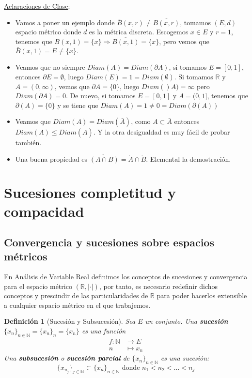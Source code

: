 \documentclass[10pt,a4paper,openright]{book}
\theoremstyle{break}
\newtheorem*{defi}{Definición}
\begin{document}
\underline{Aclaraciones de Clase}:
\begin{itemize}
\item Vamos a poner un ejemplo donde $\bar{B}(x,r)\neq \overline{B(x,r)}$, tomamos $(E,d)$ espacio métrico donde $d$ es la métrica discreta. Escogemos $x\in E$ y $r=1$, tenemos que $B(x,1)=\{x\}\Rightarrow \overline{B(x,1)} = \{x\}$, pero vemos que $\bar{B}(x,1) = E \neq \{x\}$.

\item Veamos que no siempre $Diam(A) = Diam (\partial A)$, si tomamos $E=[0,1]$, entonces $\partial E = \emptyset$, luego $Diam (E) =1 = Diam(\emptyset)$. Si tomamos $\mathbb{R}$ y $A=(0,\infty)$, vemos que $\partial A =\{0\}$, luego $Diam()A) = \infty$ pero $Diam (\partial A) = 0$. De nuevo, si tomamos $E=[0,1]$ y $A=(0,1]$, tenemos que $\partial(A) = \{0\}$ y se tiene que $Diam(A) = 1 \neq 0 = Diam (\partial(A))$

\item Veamos que $Diam(A) = Diam (\bar{A})$, como $A\subset \bar{A}$ entonces $Diam(A) \leq Diam (\bar{A})$. Y la otra desigualdad es muy fácil de probar también.

\item Una buena propiedad es $\mathring{(A\cap B)} = \mathring{A} \cap \mathring{B}$. Elemental la demostración.
\end{itemize}

\section{Sucesiones completitud y compacidad}
\subsection{Convergencia y sucesiones sobre espacios métricos}
En Análisis de Variable Real definimos los conceptos de sucesiones y convergencia para el espacio métrico $(\mathbb{R}, |\cdot|)$, por tanto, es necesario redefinir dichos conceptos y prescindir de las particularidades de $\mathbb{R}$ para poder hacerlos extensible a cualquier espacio métrico en el que trabajemos.

\begin{defi}[Sucesión y Subsucesión]
Sea $E$ un conjunto. Una \textbf{sucesión} $\{x_n\}_{n \in \mathbb{N}} = \{x_n\}_n = \{x_n\}$ es una función 
\begin{align*}
f : \mathbb{N} &\to E \\ n &\mapsto x_n
\end{align*}
Una \textbf{subsucesión} o \textbf{sucesión parcial} de $\{x_n\}_{n \in \mathbb{N}}$ es una sucesión:
$$\{x_{n_j}\}_{j \in \mathbb{N}} \subset \{x_n\}_{n \in \mathbb{N}} \mbox{ donde } n_1 < n_2 < \ldots < n_j$$
\end{defi}
\end{document}
